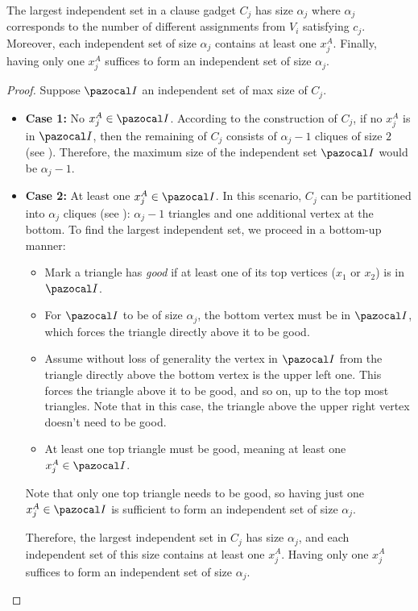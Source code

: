 \begin{lemma}
    \label{lemma:clause-gadget-indset}
    The largest independent set in a clause gadget $C_j$ has size $\alpha_j$ where $\alpha_j$ corresponds to the number of different assignments from $V_i$ satisfying $c_j$. Moreover, each independent set of size $\alpha_j$ contains at least one $x_j^A$. Finally, having only one $x_j^A$ suffices to form an independent set of size $\alpha_j$.
\end{lemma}

\begin{proof}
    Suppose $\I$ an independent set of max size of $C_j$.
    \begin{itemize}
        \item \textbf{Case 1:} No $x_j^A \in \I$. According to the construction of $C_j$, if no $x_j^A$ is in $\I$, then the remaining of $C_j$ consists of $\alpha_j - 1$ cliques of size $2$ (see ). Therefore, the maximum size of the independent set $\I$ would be $\alpha_j - 1$.
        \item \textbf{Case 2:} At least one $x_j^A \in \I$. In this scenario, $C_j$ can be partitioned into $\alpha_j$ cliques (see ): $\alpha_j - 1$ triangles and one additional vertex at the bottom. To find the largest independent set, we proceed in a bottom-up manner:
        \begin{itemize}
            \item Mark a triangle has \textit{good} if at least one of its top vertices ($x_1$ or $x_2$) is in $\I$.
            \item For $\I$ to be of size $\alpha_j$, the bottom vertex must be in $\I$, which forces the triangle directly above it to be good.
            \item Assume without loss of generality the vertex in $\I$ from the triangle directly above the bottom vertex is the upper left one. This forces the triangle above it to be good, and so on, up to the top most triangles. Note that in this case, the triangle above the upper right vertex doesn't need to be good.
            \item At least one top triangle must be good, meaning at least one $x_j^A \in \I$.
        \end{itemize}
        
        \medskip
        
        Note that only one top triangle needs to be good, so having just one $x_j^A \in \I$ is sufficient to form an independent set of size $\alpha_j$.
        
        \medskip

        Therefore, the largest independent set in $C_j$ has size $\alpha_j$, and each independent set of this size contains at least one $x_j^A$. Having only one $x_j^A$ suffices to form an independent set of size $\alpha_j$.
    \end{itemize}
\end{proof}

